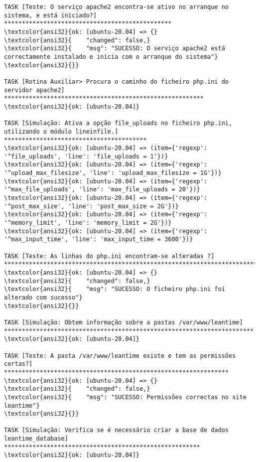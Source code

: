 \documentclass{scrartcl}
\begin{document}
\begin{Verbatim}
TASK [Teste: O serviço apache2 encontra-se ativo no arranque no sistema, e está iniciado?] ***********************************************
\textcolor{ansi32}{ok: [ubuntu-20.04] => {}
\textcolor{ansi32}{    "changed": false,}
\textcolor{ansi32}{    "msg": "SUCESSO: O serviço apache2 está correctamente instalado e inicia com o arranque do sistema"}
\textcolor{ansi32}{}}

TASK [Rotina Auxiliar> Procura o caminho do ficheiro php.ini do servidor apache2] ********************************************************
\textcolor{ansi32}{ok: [ubuntu-20.04]}

TASK [Simulação: Ativa a opção file_uploads no ficheiro php.ini, utilizando o módulo lineinfile.] ****************************************
\textcolor{ansi32}{ok: [ubuntu-20.04] => (item={'regexp': '^file_uploads', 'line': 'file_uploads = 1'})}
\textcolor{ansi32}{ok: [ubuntu-20.04] => (item={'regexp': '^upload_max_filesize', 'line': 'upload_max_filesize = 1G'})}
\textcolor{ansi32}{ok: [ubuntu-20.04] => (item={'regexp': '^max_file_uploads', 'line': 'max_file_uploads = 20'})}
\textcolor{ansi32}{ok: [ubuntu-20.04] => (item={'regexp': '^post_max_size', 'line': 'post_max_size = 2G'})}
\textcolor{ansi32}{ok: [ubuntu-20.04] => (item={'regexp': '^memory_limit', 'line': 'memory_limit = 2G'})}
\textcolor{ansi32}{ok: [ubuntu-20.04] => (item={'regexp': '^max_input_time', 'line': 'max_input_time = 3600'})}

TASK [Teste: As linhas do php.ini encontram-se alteradas ?] ******************************************************************************
\textcolor{ansi32}{ok: [ubuntu-20.04] => {}
\textcolor{ansi32}{    "changed": false,}
\textcolor{ansi32}{    "msg": "SUCESSO: O ficheiro php.ini foi alterado com sucesso"}
\textcolor{ansi32}{}}

TASK [Simulação: Obtem informação sobre a pastas /var/www/leantime] **********************************************************************
\textcolor{ansi32}{ok: [ubuntu-20.04]}

TASK [Teste: A pasta /var/www/leantime existe e tem as permissões certas?] ***************************************************************
\textcolor{ansi32}{ok: [ubuntu-20.04] => {}
\textcolor{ansi32}{    "changed": false,}
\textcolor{ansi32}{    "msg": "SUCESSO: Permissões correctas no site leantime"}
\textcolor{ansi32}{}}

TASK [Simulação: Verifica se é necessário criar a base de dados leantime_database] *******************************************************
\textcolor{ansi32}{ok: [ubuntu-20.04]}


\end{Verbatim}
\end{document}
